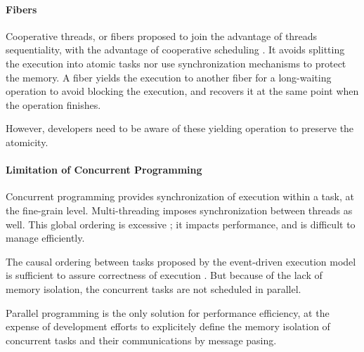 \paragraph{Fibers}

Cooperative threads, or fibers proposed to join the advantage of threads sequentiality, with the advantage of cooperative scheduling \cite{Adya2002,Behren2003a}.
It avoids splitting the execution into atomic tasks nor use synchronization mechanisms to protect the memory.
A fiber yields the execution to another fiber for a long-waiting operation to avoid blocking the execution, and recovers it at the same point when the operation finishes.

However, developers need to be aware of these yielding operation to preserve the atomicity.

\paragraph{Limitation of Concurrent Programming}




Concurrent programming provides synchronization of execution within a task, at the fine-grain level.
Multi-threading imposes synchronization between threads as well.
This global ordering is excessive ; it impacts performance, and is difficult to manage efficiently.

The causal ordering between tasks proposed by the event-driven execution model is sufficient to assure correctness of execution \cite{Lamport1978,Reed2012}.
But because of the lack of memory isolation, the concurrent tasks are not scheduled in parallel.

Parallel programming is the only solution for performance efficiency, at the expense of development efforts to explicitely define the memory isolation of concurrent tasks and their communications by message pasing.

